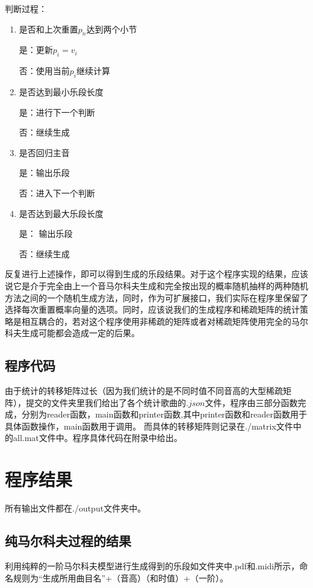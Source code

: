 \documentclass[12pt, a4paper, oneside]{ctexart}
\begin{document}
    判断过程：
    \begin{enumerate}
    	\item 是否和上次重置$p_n$达到两个小节
    	
    	是：更新$p_i=v_i$
    	
    	否：使用当前$p_i$继续计算
    	
    	\item 是否达到最小乐段长度
    	
    	是：进行下一个判断
    	
    	否：继续生成
    	
    	\item 是否回归主音
    	
    	是：输出乐段
    	
    	否：进入下一个判断
    	
    	\item 是否达到最大乐段长度
    	
    	是： 输出乐段
    	
    	否：继续生成
    \end{enumerate}
    
    反复进行上述操作，即可以得到生成的乐段结果。对于这个程序实现的结果，应该说它是介于完全由上一个音马尔科夫生成和完全按出现的概率随机抽样的两种随机方法之间的一个随机生成方法，同时，作为可扩展接口，我们实际在程序里保留了选择每次重置概率向量的选项。同时，应该说我们的生成程序和稀疏矩阵的统计策略是相互耦合的，若对这个程序使用非稀疏的矩阵或者对稀疏矩阵使用完全的马尔科夫生成可能都会造成一定的后果。
    
    \subsection{程序代码}
    由于统计的转移矩阵过长（因为我们统计的是不同时值不同音高的大型稀疏矩阵），提交的文件夹里我们给出了各个统计歌曲的$.json$文件，程序由三部分函数完成，分别为reader函数，main函数和printer函数,其中printer函数和reader函数用于具体函数操作，main函数用于调用。
	而具体的转移矩阵则记录在./matrix文件中的all.mat文件中。程序具体代码在附录中给出。
    
    \section{程序结果}
	所有输出文件都在./output文件夹中。
    \subsection{纯马尔科夫过程的结果}
    利用纯粹的一阶马尔科夫模型进行生成得到的乐段如文件夹中.pdf和.midi所示，命名规则为“生成所用曲目名”+（音高）（和时值）+（一阶）。
    
\end{document}
